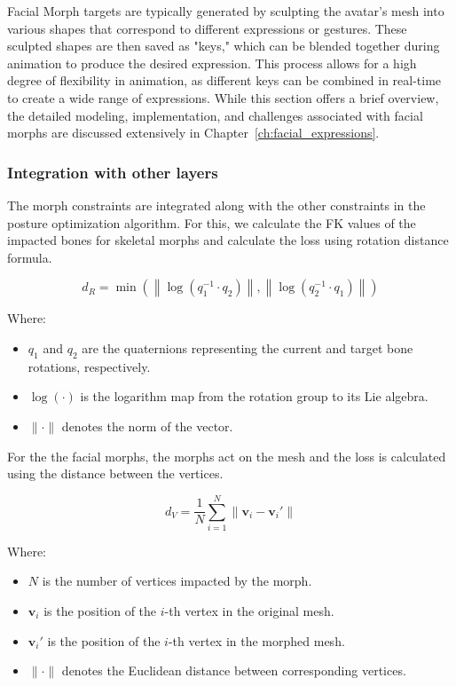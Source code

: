 \documentclass[../../main.tex]{subfiles}
\begin{document}
Facial Morph targets are typically generated by sculpting the avatar's mesh into various shapes that correspond to different expressions or gestures. These sculpted shapes are then saved as "keys," which can be blended together during animation to produce the desired expression. This process allows for a high degree of flexibility in animation, as different keys can be combined in real-time to create a wide range of expressions. While this section offers a brief overview, the detailed modeling, implementation, and challenges associated with facial morphs are discussed extensively in Chapter~\ref{ch:facial_expressions}.

\subsubsection{Integration with other layers}
\label{ch:rigging_layers:proc_rig_signing_avatars:morph_constraints:intergation}

The morph constraints are integrated along with the other constraints in the posture optimization algorithm. For this, we calculate the FK values of the impacted bones for skeletal morphs and calculate the loss using rotation distance formula.

\[
d_R = \min\left(\left\| \log\left(q_1^{-1} \cdot q_2\right) \right\|, \left\| \log\left(q_2^{-1} \cdot q_1\right) \right\|\right)
\]

Where:
\begin{itemize}
    \item \( q_1 \) and \( q_2 \) are the quaternions representing the current and target bone rotations, respectively.
    \item \( \log(\cdot) \) is the logarithm map from the rotation group to its Lie algebra.
    \item \( \|\cdot\| \) denotes the norm of the vector.
\end{itemize}

For the the facial morphs, the morphs act on the mesh and the loss is calculated using the distance between the vertices.

\[
d_V = \frac{1}{N} \sum_{i=1}^{N} \| \mathbf{v}_i - \mathbf{v}_i' \|
\]

Where:
\begin{itemize}
    \item \( N \) is the number of vertices impacted by the morph.
    \item \( \mathbf{v}_i \) is the position of the \( i \)-th vertex in the original mesh.
    \item \( \mathbf{v}_i' \) is the position of the \( i \)-th vertex in the morphed mesh.
    \item \( \|\cdot\| \) denotes the Euclidean distance between corresponding vertices.
\end{itemize}
\end{document}
